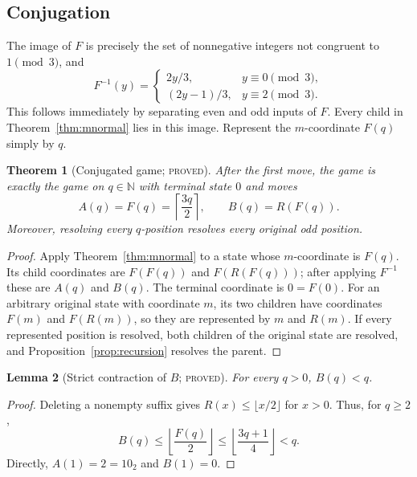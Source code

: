 \documentclass[11pt]{article}
\newtheorem{theorem}{Theorem}[section]
\newtheorem{lemma}[theorem]{Lemma}
\theoremstyle{definition}
\newcommand{\N}{\mathbb N}
\newcommand{\proved}{\textsc{proved}}
\begin{document}
\subsection{Conjugation}

The image of $F$ is precisely the set of nonnegative integers not congruent
to $1\pmod3$, and
\begin{equation}\label{eq:Finverse}
 F^{-1}(y)=
 \begin{cases}
  2y/3,&y\equiv0\pmod3,\\
  (2y-1)/3,&y\equiv2\pmod3.
 \end{cases}
\end{equation}
This follows immediately by separating even and odd inputs of $F$.
Every child in Theorem~\ref{thm:mnormal} lies in this image.  Represent the
$m$-coordinate $F(q)$ simply by $q$.

\begin{theorem}[Conjugated game; \proved]\label{thm:conjugate}
After the first move, the game is exactly the game on $q\in\N$ with terminal
state $0$ and moves
\[
  \boxed{A(q)=F(q)=\left\lceil\frac{3q}{2}\right\rceil,
  \qquad B(q)=R(F(q)).}
\]
Moreover, resolving every $q$-position resolves every original odd position.
\end{theorem}

\begin{proof}
Apply Theorem~\ref{thm:mnormal} to a state whose $m$-coordinate is $F(q)$.
Its child coordinates are $F(F(q))$ and $F(R(F(q)))$; after applying
$F^{-1}$ these are $A(q)$ and $B(q)$.  The terminal coordinate is
$0=F(0)$.  For an arbitrary original state with coordinate $m$, its two
children have coordinates $F(m)$ and $F(R(m))$, so they are represented by
$m$ and $R(m)$.  If every represented position is resolved, both children of
the original state are resolved, and Proposition~\ref{prop:recursion} resolves
the parent.
\end{proof}

\begin{lemma}[Strict contraction of $B$; \proved]\label{lem:Bcontract}
For every $q>0$, $B(q)<q$.
\end{lemma}

\begin{proof}
Deleting a nonempty suffix gives $R(x)\le\lfloor x/2\rfloor$ for $x>0$.
Thus, for $q\ge2$,
\[
 B(q)\le\left\lfloor\frac{F(q)}2\right\rfloor
 \le\left\lfloor\frac{3q+1}{4}\right\rfloor<q.
\]
Directly, $A(1)=2=10_2$ and $B(1)=0$.
\end{proof}
\end{document}
